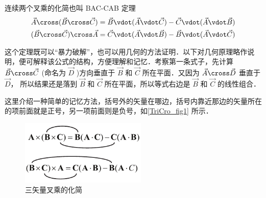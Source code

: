 

连续两个叉乘的化简也叫 BAC-CAB 定理
\begin{gather}
\vec A \cross (\vec B \cross \vec C) = \vec B \vdot (\vec A \vdot \vec C) - \vec C \vdot (\vec A \vdot \vec B)\\
(\vec B \cross \vec C) \cross \vec A = \vec C \vdot (\vec A \vdot \vec B) - \vec B \vdot (\vec A \vdot \vec C)
\end{gather}

这个定理既可以“暴力破解”，也可以用几何的方法证明．以下对几何原理略作说明，便可解释该公式的结构，方便理解和记忆．考察第一条式子，先计算 $\vec B \cross \vec C$ (命名为 $\vec D$ )方向垂直于 $\vec B$ 和 $\vec C$ 所在平面．又因为 $\vec A \cross \vec D$ 垂直于 $\vec D$， 所以结果还是落到 $\vec B$ 和 $\vec C$ 所在平面，所以等式右边是 $\vec B$ 和 $\vec C$ 的线性组合．

这里介绍一种简单的记忆方法，括号外的矢量在哪边，括号内靠近那边的矢量所在的项前面就是正号，另一项前面则是负号，如\autoref{TriCro_fig1} 所示．

\begin{figure}[ht]
\centering
\includegraphics[width=6cm]{./figures/TriCro.pdf}
\caption{三矢量叉乘的化简}\label{TriCro_fig1}
\end{figure}
 
